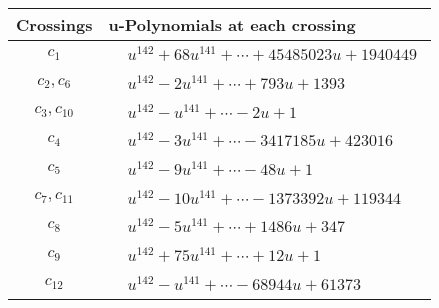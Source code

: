 \documentclass[1p]{elsarticle_modified}
\theoremstyle{definition}
\begin{document}
\begin{tabular}{m{50pt}|m{274pt}}
Crossings & \hspace{64pt}u-Polynomials at each crossing \\
\hline $$\begin{aligned}c_{1}\end{aligned}$$&$\begin{aligned}
&u^{142}+68 u^{141}+\cdots+45485023 u+1940449
\end{aligned}$\\
\hline $$\begin{aligned}c_{2},c_{6}\end{aligned}$$&$\begin{aligned}
&u^{142}-2 u^{141}+\cdots+793 u+1393
\end{aligned}$\\
\hline $$\begin{aligned}c_{3},c_{10}\end{aligned}$$&$\begin{aligned}
&u^{142}- u^{141}+\cdots-2 u+1
\end{aligned}$\\
\hline $$\begin{aligned}c_{4}\end{aligned}$$&$\begin{aligned}
&u^{142}-3 u^{141}+\cdots-3417185 u+423016
\end{aligned}$\\
\hline $$\begin{aligned}c_{5}\end{aligned}$$&$\begin{aligned}
&u^{142}-9 u^{141}+\cdots-48 u+1
\end{aligned}$\\
\hline $$\begin{aligned}c_{7},c_{11}\end{aligned}$$&$\begin{aligned}
&u^{142}-10 u^{141}+\cdots-1373392 u+119344
\end{aligned}$\\
\hline $$\begin{aligned}c_{8}\end{aligned}$$&$\begin{aligned}
&u^{142}-5 u^{141}+\cdots+1486 u+347
\end{aligned}$\\
\hline $$\begin{aligned}c_{9}\end{aligned}$$&$\begin{aligned}
&u^{142}+75 u^{141}+\cdots+12 u+1
\end{aligned}$\\
\hline $$\begin{aligned}c_{12}\end{aligned}$$&$\begin{aligned}
&u^{142}- u^{141}+\cdots-68944 u+61373
\end{aligned}$\\
\hline
\end{tabular}\\~\\
\end{document}
